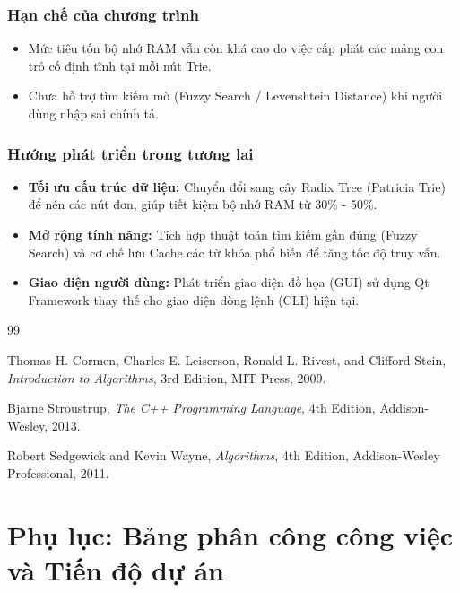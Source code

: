 \documentclass[12pt,a4paper]{report}
\begin{document}
\subsection{Hạn chế của chương trình}
\begin{itemize}
    \item Mức tiêu tốn bộ nhớ RAM vẫn còn khá cao do việc cấp phát các mảng con trỏ cố định tĩnh tại mỗi nút Trie.
    \item Chưa hỗ trợ tìm kiếm mờ (Fuzzy Search / Levenshtein Distance) khi người dùng nhập sai chính tả.
\end{itemize}

\subsection{Hướng phát triển trong tương lai}
\begin{itemize}
    \item \textbf{Tối ưu cấu trúc dữ liệu:} Chuyển đổi sang cây Radix Tree (Patricia Trie) để nén các nút đơn, giúp tiết kiệm bộ nhớ RAM từ 30\% - 50\%.
    \item \textbf{Mở rộng tính năng:} Tích hợp thuật toán tìm kiếm gần đúng (Fuzzy Search) và cơ chế lưu Cache các từ khóa phổ biến để tăng tốc độ truy vấn.
    \item \textbf{Giao diện người dùng:} Phát triển giao diện đồ họa (GUI) sử dụng Qt Framework thay thế cho giao diện dòng lệnh (CLI) hiện tại.
\end{itemize}

{\let\clearpage\relax
\begin{thebibliography}{99}

Thomas H. Cormen, Charles E. Leiserson, Ronald L. Rivest, and Clifford Stein,
\textit{Introduction to Algorithms}, 3rd Edition, MIT Press, 2009.

Bjarne Stroustrup,
\textit{The C++ Programming Language}, 4th Edition, Addison-Wesley, 2013.

Robert Sedgewick and Kevin Wayne,
\textit{Algorithms}, 4th Edition, Addison-Wesley Professional, 2011.

\end{thebibliography}
}
\clearpage
\chapter*{Phụ lục: Bảng phân công công việc và Tiến độ dự án}
\end{document}
